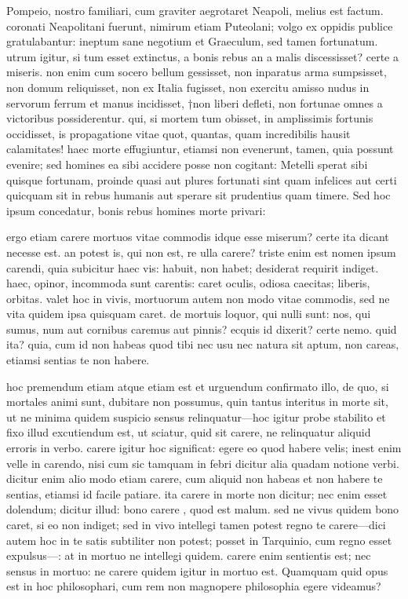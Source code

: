  Pompeio, nostro familiari, cum graviter aegrotaret Neapoli, melius est factum. coronati Neapolitani fuerunt, nimirum etiam Puteolani; volgo ex oppidis publice gratulabantur: ineptum sane negotium et Graeculum, sed tamen fortunatum. utrum igitur, si tum esset extinctus, a bonis rebus an a malis discessisset? certe a miseris. non enim cum socero bellum gessisset, non inparatus arma sumpsisset, non domum reliquisset, non ex Italia fugisset, non exercitu amisso nudus in servorum ferrum et manus incidisset, †non liberi defleti, non fortunae omnes a victoribus possiderentur. qui, si mortem tum obisset, in amplissimis fortunis occidisset, is propagatione vitae quot, quantas, quam incredibilis hausit calamitates! haec morte effugiuntur, etiamsi non evenerunt, tamen, quia possunt evenire; sed homines ea sibi accidere posse non cogitant: Metelli sperat sibi quisque fortunam, proinde quasi aut plures fortunati sint quam infelices aut certi quicquam sit in rebus humanis aut sperare sit prudentius quam timere. Sed hoc ipsum concedatur, bonis rebus homines morte privari:

 ergo etiam carere mortuos vitae commodis idque esse miserum? certe ita dicant necesse est. an potest is, qui non est, re ulla carere? triste enim est nomen ipsum carendi, quia subicitur haec vis: habuit, non habet; desiderat requirit indiget. haec, opinor, incommoda sunt carentis: caret oculis, odiosa caecitas; liberis, orbitas. valet hoc in vivis, mortuorum autem non modo vitae commodis, sed ne vita quidem ipsa quisquam caret. de mortuis loquor, qui nulli sunt: nos, qui sumus, num aut cornibus caremus aut pinnis? ecquis id dixerit? certe nemo. quid ita? quia, cum id non habeas quod tibi nec usu nec natura sit aptum, non careas, etiamsi sentias te non habere.

 hoc premendum etiam atque etiam est et urguendum confirmato illo, de quo, si mortales animi sunt, dubitare non possumus, quin tantus interitus in morte sit, ut ne minima quidem suspicio sensus relinquatur—hoc igitur probe stabilito et fixo illud excutiendum est, ut sciatur, quid sit carere, ne relinquatur aliquid erroris in verbo. carere igitur hoc significat: egere eo quod habere velis; inest enim velle in carendo, nisi cum sic tamquam in febri dicitur alia quadam notione verbi. dicitur enim alio modo etiam carere, cum aliquid non habeas et non habere te sentias, etiamsi id facile patiare. ita carere in morte non dicitur; nec enim esset dolendum; dicitur illud: bono carere , quod est malum. sed ne vivus quidem bono caret, si eo non indiget; sed in vivo intellegi tamen potest regno te carere—dici autem hoc in te satis subtiliter non potest; posset in Tarquinio, cum regno esset expulsus—: at in mortuo ne intellegi quidem. carere enim sentientis est; nec sensus in mortuo: ne carere quidem igitur in mortuo est. Quamquam quid opus est in hoc philosophari, cum rem non magnopere philosophia egere videamus?

